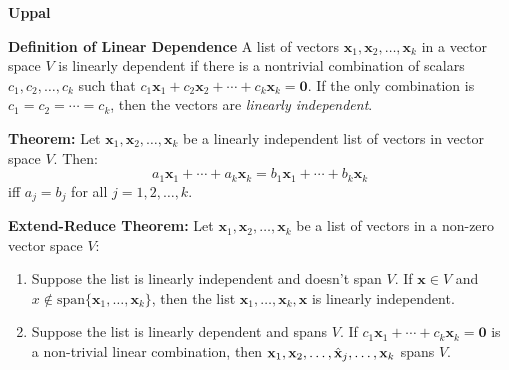 \documentclass{article}
\newcommand{\bff}[1]{\mathbf{#1}}
\newcommand{\spann}[1]{\mathrm{span}\{#1\}}
\begin{document}
    \begin{minipage}[t]{.45\textwidth} %
        \begin{center}
            \textbf{Uppal}
        \end{center}
        \textbf{Definition of Linear Dependence} A list of vectors $\bff{x}_1, \bff{x}_2, \dots, \bff{x}_k$ in a vector space $V$ is linearly dependent if there is a nontrivial combination of scalars $c_1,c_2,\dots, c_k$ such that $c_1\bff{x}_1+c_2\bff{x}_2+\cdots+c_k\bff{x}_k=\bff{0}$. If the only combination is $c_1=c_2=\cdots =c_k$, then the vectors are \textit{linearly independent}.
        \vspace{2mm}

        \textbf{Theorem:} Let $\bff{x}_1, \bff{x}_2,\dots,\bff{x}_k$ be a linearly independent list of vectors in vector space $V$. Then:
        \begin{equation*}
            a_1\bff{x}_1 + \cdots + a_k\bff{x}_k = b_1\bff{x}_1+ \cdots + b_k\bff{x}_k
        \end{equation*}
        iff $a_j = b_j$ for all $j=1,2,\dots,k.$
        \vspace{2mm}

        \textbf{Extend-Reduce Theorem:} Let $\bff{x}_1, \bff{x}_2, \dots, \bff{x}_k$ be a list of vectors in a non-zero vector space $V$:
        \begin{enumerate}[label=(\alph*)]
            \item Suppose the list is linearly independent and doesn't span $V$. If $\bff{x} \in V$ and $x \notin \spann{\bff{x}_1, \dots, \bff{x}_k}$, then the list $\bff{x}_1, \dots,\bff{x}_k,\bff{x}$ is linearly independent.
            \item Suppose the list is linearly dependent and spans $V$. If $c_1\bff{x}_1+\cdots+c_k\bff{x}_k=\bff{0}$ is a non-trivial linear combination, then $\bff{x}_1,\bff{x}_2,\dots,\hat{\bf{x}}_j,\dots, \bff{x}_k$ spans $V$.
        \end{enumerate}
    \end{minipage}\newpage
\end{document}
